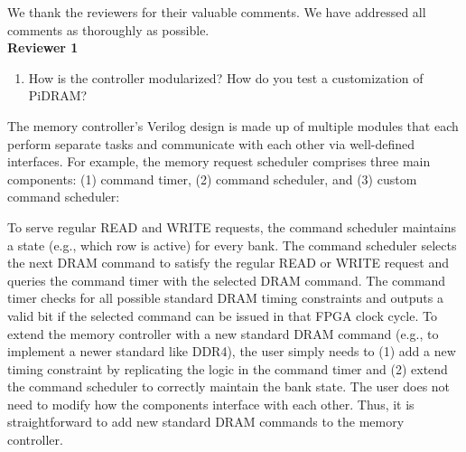 
\begin{center}
    {\LARGE {}}
\end{center}

We thank the reviewers for their valuable comments. We have addressed all comments as thoroughly as possible.\\

\noindent \textbf{\large{Reviewer 1}}

\bigbreak
\begin{tcolorbox}
    \begin{enumerate}[label=R1/\arabic*]
        \item \label{q:r1q1} How is the controller modularized? How do you test a customization of PiDRAM? 
    \end{enumerate}
\end{tcolorbox} 

The memory controller’s Verilog design is made up of multiple modules that each perform separate tasks and communicate with each other via well-defined interfaces. For example, the memory request scheduler comprises three main components: (1) command timer, (2) command scheduler, and (3) custom command scheduler:

To serve regular READ and WRITE requests, the command scheduler maintains a state (e.g., which row is active) for every bank. The command scheduler selects the next DRAM command to satisfy the regular READ or WRITE request and queries the command timer with the selected DRAM command. The command timer checks for all possible standard DRAM timing constraints and outputs a valid bit if the selected command can be issued in that FPGA clock cycle. To extend the memory controller with a new standard DRAM command (e.g., to implement a newer standard like DDR4), the user simply needs to (1) add a new timing constraint by replicating the logic in the command timer and (2) extend the command scheduler to correctly maintain the bank state. The user does not need to modify how the components interface with each other. Thus, it is straightforward to add new standard DRAM commands to the memory controller.

